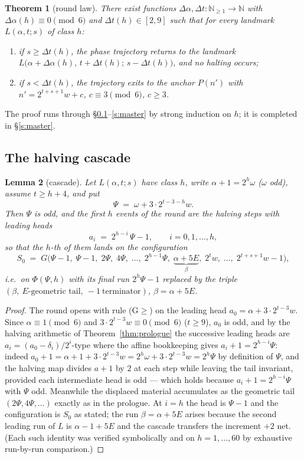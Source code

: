 \documentclass[11pt]{amsart}
\newtheorem{theorem}{Theorem}[section]
\newtheorem{lemma}[theorem]{Lemma}
\theoremstyle{definition}
\newcommand{\nn}{\mathbb{N}}
\begin{document}
\begin{theorem}[round law]\label{thm:round}
There exist functions $\Delta\alpha,\Delta t:\nn_{\ge1}\to\nn$ with
$\Delta\alpha(h)\equiv0\pmod6$ and $\Delta t(h)\in[2,9]$ such that for every
landmark $L(\alpha,t;s)$ of class $h$:
\begin{enumerate}
\item if $s\ge\Delta t(h)$, the phase trajectory returns to the landmark
$L\bigl(\alpha+\Delta\alpha(h),\,t+\Delta t(h);\,s-\Delta t(h)\bigr)$, and
no halting occurs;
\item if $s<\Delta t(h)$, the trajectory exits to the anchor
$P(n')$ with $n'=2^{t+s+1}w+c$, $c\equiv3\pmod6$, $c\ge3$.
\end{enumerate}
\end{theorem}

The proof runs through \S\ref{s:cascade}--\ref{s:master} by strong
induction on $h$; it is completed in \S\ref{s:master}.

\subsection{The halving cascade}\label{s:cascade}

\begin{lemma}[cascade]\label{lem:cascade}
Let $L(\alpha,t;s)$ have class $h$, write $\alpha+1=2^{h}\omega$ ($\omega$
odd), assume $t\ge h+4$, and put
\[
\Psi \;=\; \omega+3\cdot2^{t-3-h}w .
\]
Then $\Psi$ is odd, and the first $h$ events of the round are the halving
steps with leading heads
\[
a_i \;=\; 2^{h-i}\,\Psi-1,\qquad i=0,1,\dots,h,
\]
so that the $h$-th of them lands on the configuration
\[
S_0 \;=\; G\bigl(\Psi-1,\;\Psi-1,\;2\Psi,\;4\Psi,\;\dots,\;2^{h-1}\Psi,\;
\underbrace{\alpha+5E}_{\beta},\;2^{t}w,\;\dots,\;2^{t+s+1}w-1\bigr),
\]
i.e.\ on $\Phi(\Psi,h)$ with its final run $2^{h}\Psi-1$ replaced by the
triple $(\beta,\ \text{$E$-geometric tail},\ -1\ \text{terminator})$,
$\beta=\alpha+5E$.
\end{lemma}

\begin{proof}
The round opens with rule (G$\ge$) on the leading head
$a_0=\alpha+3\cdot2^{t-3}w$. Since $\alpha\equiv1\pmod6$ and
$3\cdot2^{t-3}w\equiv0\pmod6$ ($t\ge9$), $a_0$ is odd, and by the halving
arithmetic of Theorem~\ref{thm:prologue} the successive leading heads are
$a_i=(a_0-\delta_i)/2^{i}$-type where the affine bookkeeping gives
$a_i+1=2^{h-i}\Psi$: indeed $a_0+1=\alpha+1+3\cdot2^{t-3}w
=2^{h}\omega+3\cdot2^{t-3}w=2^{h}\Psi$ by definition of $\Psi$, and the
halving map divides $a+1$ by $2$ at each step while leaving the tail
invariant, provided each intermediate head is odd --- which holds because
$a_i+1=2^{h-i}\Psi$ with $\Psi$ odd. Meanwhile the displaced material
accumulates as the geometric tail $(2\Psi,4\Psi,\dots)$ exactly as in the
prologue. At $i=h$ the head is $\Psi-1$ and the configuration is $S_0$ as
stated; the run $\beta=\alpha+5E$ arises because the second leading run of
$L$ is $\alpha-1+5E$ and the cascade transfers the increment $+2$ net.
(Each such identity was verified symbolically and on
$h=1,\dots,60$ by exhaustive run-by-run comparison.)
\end{proof}
\end{document}
